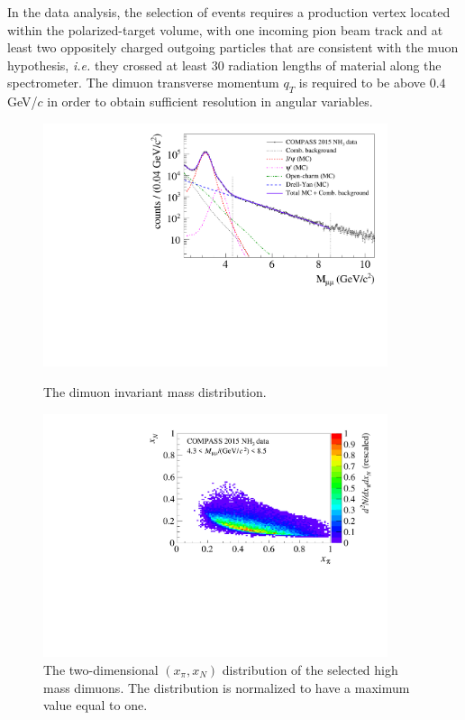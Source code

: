 \documentclass[a4paper,manyauthors,nocleardouble,COMPASS]{cernphprep}
\newcommand{\gvc}{GeV/$c$}
\begin{document}
In the data analysis, the selection of events requires a production vertex located within the polarized-target volume, with one incoming pion beam track and at least two oppositely charged outgoing particles that are consistent with the muon hypothesis, \textit{i.e.} they crossed at least 30 radiation lengths of material along the spectrometer.
%
%
The dimuon transverse momentum $q_T$ is required to be above $0.4$ \gvc\; in order to obtain sufficient resolution in angular variables.

%
\begin{figure}[tbp]
 \begin{minipage}[t]{0.47\linewidth}
 \center
 \includegraphics[width=0.9\textwidth]{plots/DY_MassFit.pdf}
 \caption{The dimuon invariant mass distribution.}
 \label{fig:M}
 \end{minipage}
 \begin{minipage}[t]{0.53\linewidth}
 \center
 \includegraphics[width=0.9\textwidth]{plots/DY2015_Mr4_NH3_xbxN.pdf}
 \caption{The two-dimensional $(x_{\pi},x_{N})$ distribution of the selected high mass dimuons. The distribution is normalized to have a maximum value equal to one.}
 \label{fig:x1x2}
 \end{minipage}
\end{figure}
\end{document}
